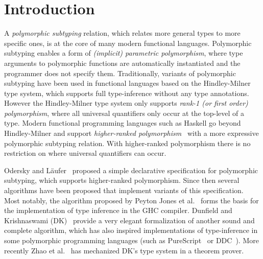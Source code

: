 \section{Introduction}

A \emph{polymorphic subtyping} relation, which relates more general
types to more specific ones, is at the core of many modern functional
languages. Polymorphic subtyping enables a form of
\emph{(implicit) parametric polymorphism}, where type arguments to polymorphic
functions are automatically instantiated and the programmer does not specify them.
Traditionally, variants of polymorphic subtyping have been used in functional languages based on the
Hindley-Milner~\cite{hindley1969principal,milner1978theory,damas1982principal}
type system, which supports full type-inference without any type annotations.
However the Hindley-Milner type system only supports \emph{rank-1 (or first order)
polymorphism}, where all universal quantifiers only occur at the top-level
of a type.  Modern functional programming languages such as Haskell go beyond
Hindley-Milner and support \emph{higher-ranked polymorphism}~\cite{odersky1996putting,jones2007practical}
with a more expressive
polymorphic subtyping relation. With higher-ranked
polymorphism there is no restriction on where universal quantifiers can occur.

Odersky and L\"aufer~\cite{odersky1996putting} proposed a
simple declarative specification for polymorphic subtyping, which supports higher-ranked polymorphism.
Since then several
algorithms have been proposed that implement variants of this specification. Most
notably, the algorithm proposed by Peyton Jones et al.~\cite{jones2007practical} forms the basis
for the implementation of type inference in the GHC compiler.
Dunfield and Krishnaswami (DK)~\cite{dunfield2013complete} provide a very elegant
formalization of another sound and complete algorithm, which has
also inspired implementations of type-inference in some polymorphic
programming languages (such as PureScript~\cite{PureScript} or DDC~\cite{Disciple}).
More recently Zhao et al.~\cite{zhao19mechanical} has mechanized DK's type system in a theorem prover.


